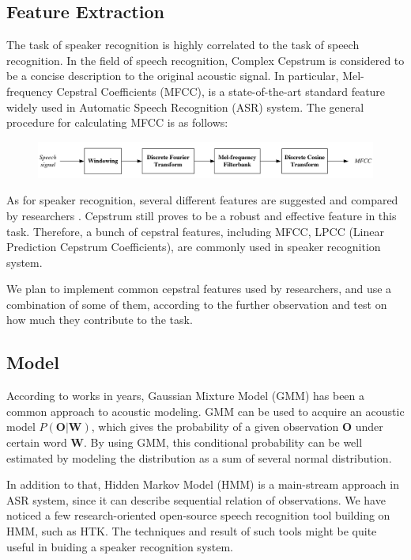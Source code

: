 \documentclass{article}
\begin{document}
\subsection{Feature Extraction}
The task of speaker recognition is highly correlated to the task of speech recognition.
In the field of speech recognition, Complex Cepstrum \cite{cepstrum} is
considered to be a concise description to the original acoustic signal.
In particular, Mel-frequency Cepstral Coefficients (MFCC), is a state-of-the-art standard feature
widely used in Automatic Speech Recognition (ASR) system.
The general procedure for calculating MFCC is as follows:
\begin{figure}[H]
  \centering
  \includegraphics[width=\textwidth]{res/MFCC.png}
\end{figure}

As for speaker recognition, several different features are suggested and compared
by researchers \cite{evaluation}. Cepstrum still proves to be a robust and effective
feature in this task. Therefore, a bunch of cepstral features, including MFCC,
LPCC (Linear Prediction Cepstrum Coefficients), are commonly used
in speaker recognition system.\cite{feature}

We plan to implement common cepstral features used by researchers, and use a
combination of some of them, according to the further observation and test on how
much they contribute to the task.

\subsection{Model}
According to works in years, Gaussian Mixture Model (GMM)
has been a common approach to acoustic modeling.\cite{GMM}
GMM can be used to acquire an acoustic model $P(\mathbf{O} | \mathbf{W}) $,
which gives the probability of a given observation
$\mathbf{O}$ under certain word $\mathbf{W}$. By using GMM, this
conditional probability can be well estimated by modeling the distribution as
a sum of several normal distribution.

In addition to that, Hidden Markov Model (HMM) is a main-stream approach in ASR system,
since it can describe sequential relation of observations.\cite{SLP}
We have noticed a few research-oriented open-source speech recognition
tool building on HMM, such as HTK\cite{htk}.
The techniques and result of such tools might be quite useful in buiding a
speaker recognition system.
\end{document}
